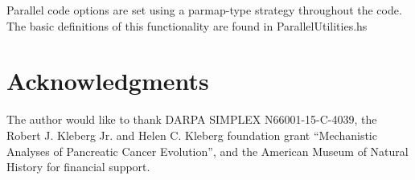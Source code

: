 \documentclass[11pt]{article}
\begin{document}
	Parallel code options are set using a parmap-type strategy throughout the code.  The basic definitions of this functionality are found in ParallelUtilities.hs
	
	\section*{Acknowledgments}
	The author would like to thank DARPA SIMPLEX N66001-15-C-4039, the  Robert J. Kleberg Jr. and Helen C. Kleberg foundation grant ``Mechanistic Analyses of Pancreatic Cancer Evolution'', and the American Museum of Natural History for financial support.  
	
	\newpage
	
\end{document}
